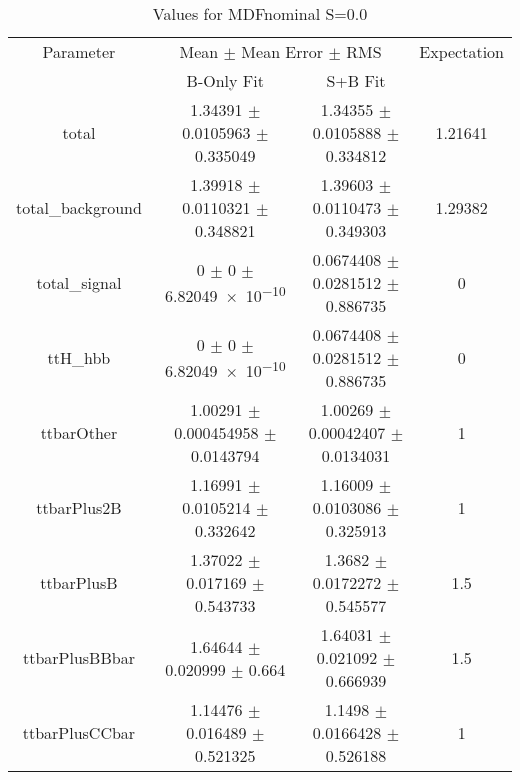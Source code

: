 \begin{table}
\centering
\caption{Values for MDFnominal S=0.0}
\begin{tabular}{cccc}
\toprule
Parameter & \multicolumn{2}{c}{Mean $\pm$ Mean Error $\pm$ RMS} & Expectation\\
 & B-Only Fit & S+B Fit & \\
\midrule
total & \num{1.34391} $\pm$ \num{0.0105963} $\pm$ \num{0.335049} & \num{1.34355} $\pm$ \num{0.0105888} $\pm$ \num{0.334812} & \num{1.21641}\\
total\_background & \num{1.39918} $\pm$ \num{0.0110321} $\pm$ \num{0.348821} & \num{1.39603} $\pm$ \num{0.0110473} $\pm$ \num{0.349303} & \num{1.29382}\\
total\_signal & \num{0} $\pm$ \num{0} $\pm$ \num{6.82049e-10} & \num{0.0674408} $\pm$ \num{0.0281512} $\pm$ \num{0.886735} & \num{0}\\
ttH\_hbb & \num{0} $\pm$ \num{0} $\pm$ \num{6.82049e-10} & \num{0.0674408} $\pm$ \num{0.0281512} $\pm$ \num{0.886735} & \num{0}\\
ttbarOther & \num{1.00291} $\pm$ \num{0.000454958} $\pm$ \num{0.0143794} & \num{1.00269} $\pm$ \num{0.00042407} $\pm$ \num{0.0134031} & \num{1}\\
ttbarPlus2B & \num{1.16991} $\pm$ \num{0.0105214} $\pm$ \num{0.332642} & \num{1.16009} $\pm$ \num{0.0103086} $\pm$ \num{0.325913} & \num{1}\\
ttbarPlusB & \num{1.37022} $\pm$ \num{0.017169} $\pm$ \num{0.543733} & \num{1.3682} $\pm$ \num{0.0172272} $\pm$ \num{0.545577} & \num{1.5}\\
ttbarPlusBBbar & \num{1.64644} $\pm$ \num{0.020999} $\pm$ \num{0.664} & \num{1.64031} $\pm$ \num{0.021092} $\pm$ \num{0.666939} & \num{1.5}\\
ttbarPlusCCbar & \num{1.14476} $\pm$ \num{0.016489} $\pm$ \num{0.521325} & \num{1.1498} $\pm$ \num{0.0166428} $\pm$ \num{0.526188} & \num{1}\\
\bottomrule
\end{tabular}
\end{table}